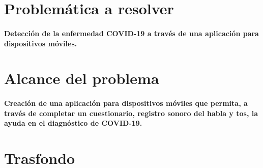 \documentclass[12pt]{article}
\begin{document}
\section{Problemática a resolver}
\paragraph{
Detección de la enfermedad COVID-19 a través de una aplicación para dispositivos móviles.}
\section{Alcance del problema}
\paragraph{
Creación de una aplicación para dispositivos móviles que permita, a través de completar un  cuestionario, registro sonoro del habla y tos, la ayuda en el diagnóstico de COVID-19.}
\section{Trasfondo}
\end{document}
